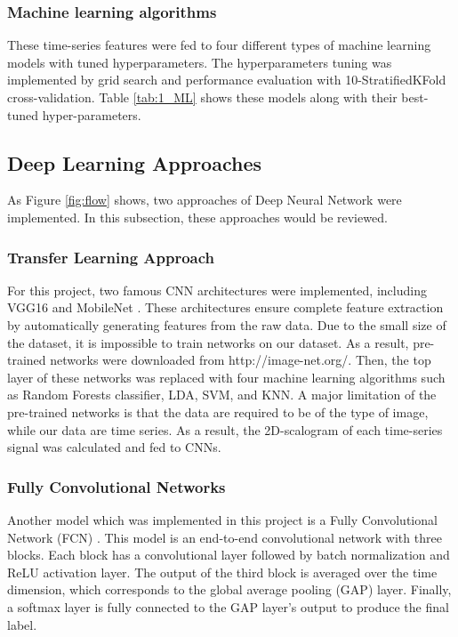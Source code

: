 \subsubsection{Machine learning algorithms}

These time-series features were fed to four different types of machine learning models with tuned hyperparameters. The hyperparameters tuning was implemented by grid search and performance evaluation with 10-StratifiedKFold cross-validation. Table \ref{tab:1_ML} shows these models along with their best-tuned hyper-parameters.

\subsection{Deep Learning Approaches}
  
As Figure \ref{fig:flow} shows, two approaches of Deep Neural Network were implemented. In this subsection, these approaches would be reviewed.


\subsubsection{Transfer Learning Approach}
For this project, two famous CNN architectures were implemented, including VGG16 \cite{Simonyan2015VeryRecognition} and MobileNet \cite{Howard2017MobileNets:Applications}. These architectures ensure complete feature extraction by automatically generating features from the raw data. 
Due to the small size of the dataset, it is impossible to train networks on our dataset. As a result, pre-trained networks were downloaded from http://image-net.org/. Then, the top layer of these networks was replaced with four machine learning algorithms such as Random Forests classifier, LDA, SVM, and KNN. 
A major limitation of the pre-trained networks is that the data are required to be of the type of image, while our data are time series. As a result, the 2D-scalogram of each time-series signal was calculated and fed to CNNs. 



\subsubsection{Fully Convolutional Networks}
Another model which was implemented in this project is a Fully Convolutional Network (FCN) \cite{WangTimeBaseline}. This model is an end-to-end convolutional network with three blocks. Each block has a convolutional layer followed by batch normalization and ReLU activation layer. The output of the third block is averaged over the time dimension, which corresponds to the global average pooling (GAP) layer. Finally, a softmax layer is fully connected to the GAP layer’s output to produce the final label.


